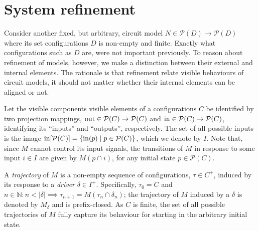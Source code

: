 \section{System refinement}

Consider another fixed, but arbitrary, circuit model $N \in \mathcal{P}(D) \rightarrow \mathcal{P}(D)$ where its set configurations $D$ is non-empty and finite. Exactly what configurations such as $D$ are, were not important previously. To reason about refinement of models, however, we make a distinction between their external and internal elements. The rationale is that refinement relate visible behaviours of circuit models, it should not matter whether their internal elements can be aligned or not.

Let the visible components visible elements of a configurations $C$ be identified by two projection mappings, $\operatorname{out} \in \mathcal{P}(C) \rightarrow \mathcal{P}(C)$ and $\operatorname{in} \in \mathcal{P}(C) \rightarrow \mathcal{P}(C)$, identifying its ``inputs'' and ``outputs'', respectively. The set of all possible inputs is the image $\operatorname{in}[\mathcal{P}(C)] = \{ \operatorname{in}(p) \mid p \in \mathcal{P}(C) \}$, which we denote by $I$. Note that, since $M$ cannot control its input signals, the transitions of $M$ in response to some input $i \in I$ are given by $M(p \cap i)$, for any initial state $p \in \mathcal{P}(C)$.

A \textit{trajectory} of $M$ is a non-empty sequence of configurations, $\tau \in C^{+}$, induced by its response to a \textit{driver} $\delta \in I^{+}$. Specifically, $\tau_{0} = C$ and $n \in \mathbb{N} : n < | \delta | \implies \tau_{n+1} = M(\tau_{n} \cap \delta_{n})$; the trajectory of $M$ induced by a $\delta$ is denoted by $M_{\delta}$ and is prefix-closed. As $C$ is finite, the set of all possible trajectories of $M$ fully capture its behaviour for starting in the arbitrary initial state.

